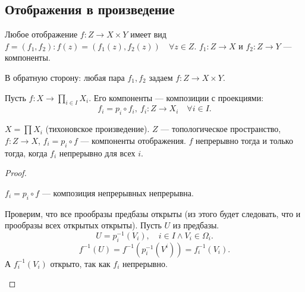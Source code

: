 \documentclass[11pt]{book}
\theoremstyle{definition}
\theoremstyle{plain}
\theoremstyle{plain}
\theoremstyle{definition}
\theoremstyle{remark}
\begin{document}
\subsection{Отображения в произведение}
\begin{defn}
    Любое отображение $ f: Z \to X \times Y$ имеет вид $ f = (f_1, f_2): f(z) = (f_1(z), f_2(z)) \quad \forall  z \in Z $.
    $ f_1: Z \to  X$ и $ f_2: Z \to  Y$ --- компоненты.

    В обратную сторону: любая пара $ f_1, f_2$ задаем $ f: Z \to  X \times Y$.
\end{defn}
\begin{defn}
    Пусть $ f: X \to \prod_{i \in I}X_i$. Его компоненты --- композиции с проекциями:
    \[
    f_i = p_i \circ f_i, ~ f_i : Z \to  X_i \quad \forall  i \in I
    .\] 
\end{defn}
\begin{thm}\label{th_coord}
    $ X = \prod X_i$ (тихоновское произведение). $ Z$ --- топологическое пространство, $ f: Z \to  X$, $ f_i = p_i \circ f$ --- компоненты отображения.
    $ f$ непрерывно тогда и только тогда, когда  $ f_i$ непрерывно для всех $ i$.
\end{thm}
\begin{proof}
    $ $
    \begin{description}
        \item {} $ f_i = p_i \circ f$ --- композиция непрерывных непрерывна.
	\item {} 
		Проверим, что все прообразы предбазы открыты (из этого будет следовать, что и прообразы всех открытых открыты).
		Пусть $ U$ из предбазы.
		\[
		    U = p_i^{-1}(V_i), \quad i \in I \wedge V_i \in \Omega_i
		.\] 
		\[
		    f^{-1}(U) = f^{-1} (p_i^{-1}(V^{i})) = f_i^{-1}(V_i)
		.\] 
		А $ f_i^{-1}(V_i)$ открыто, так как $ f_i$ непрерывно.
    \end{description} 
\end{proof}
\end{document}
